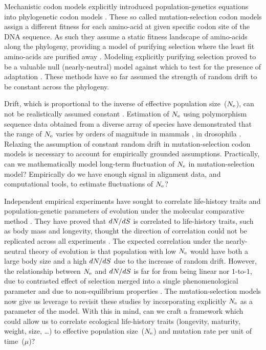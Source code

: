 Mechanistic \gls{codon} models explicitly introduced population-genetics equations into phylogenetic \gls{codon} models \citep{Halpern1998}.
These so called mutation-selection \gls{codon} models assign a different fitness for each amino-acid at given specific \gls{codon} site of the \acrshort{DNA} sequence.
As such they assume a static fitness landscape of amino-acids along the phylogeny, providing a model of purifying selection where the least fit amino-acids are purified away \citep{Rodrigue2010,Rodrigue2014,Tamuri2012,Tamuri2014}.
Modeling explicitly purifying selection proved to be a valuable null (\gls{nearly-neutral}) model against which to test for the presence of adaptation \citep{Rodrigue2016,Bloom2017}.
These methods have so far assumed the strength of random drift to be constant across the phylogeny.

Drift, which is proportional to the inverse of effective population size~($N_{\mathrm{e}}$), can not be realistically assumed constant \citep{Ohta1992}.
Estimation of $N_{\mathrm{e}}$ using polymorphism sequence data obtained from a diverse array of species have demonstrated that the range of $N_{\mathrm{e}}$ varies by orders of magnitude in mammals \citep{Galtier2016}, in drosophila \citep{Benger2013,Keightley2016}.
Relaxing the assumption of constant random drift in mutation-selection \gls{codon} models is necessary to account for empirically grounded
assumptions.
Practically, can we mathematically model long-term fluctuation of $N_{\mathrm{e}}$ in mutation-selection model?
Empirically do we have enough signal in alignment data, and computational tools, to estimate fluctuations of $N_{\mathrm{e}}$?

Independent empirical experiments have sought to correlate life-history traits and population-genetic parameters of evolution under the molecular comparative method \citep{Lartillot2011,Weber2014}.
They have proved that $dN/dS$ is correlated to life-history traits, such as body mass and longevity, thought the direction of correlation could not be replicated across all experiments \citep{Figuet2016}.
The expected correlation under the \gls{nearly-neutral} theory of evolution is that population with low $N_{\mathrm{e}}$ would have both a large body size and a high $dN/dS$ due to the increase of random drift.
However, the relationship between $N_{\mathrm{e}}$ and $dN/dS$ is far for from being linear nor $1$-to-$1$, due to contrasted effect of selection merged into a single phenomenological parameter and due to non-equilibrium properties \citep{Jones2016}.
The mutation-selection models now give us leverage to revisit these studies by incorporating explicitly $N_{\mathrm{e}}$ as a parameter of the model.
With this in mind, can we craft a framework which could allow us to correlate ecological life-history traits (longevity, maturity, weight, size, \ldots) to effective population size~($N_{\mathrm{e}}$) and mutation rate per unit of time~($\mu$)?

